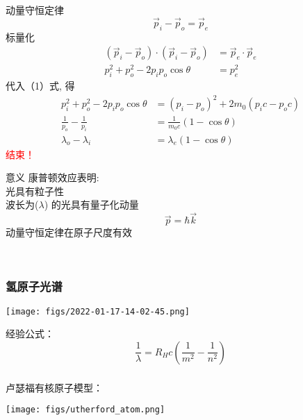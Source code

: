 \begin{frame}  
    动量守恒定律
    \[\vec{p}_i -\vec{p}_o = \vec{p}_e\]
    标量化
    \begin{equation*}
        \begin{split}
            (\vec{p}_i -\vec{p}_o)\cdot (\vec{p}_i -\vec{p}_o)  &= \vec{p}_e\cdot \vec{p}_e   \\
            p_i ^2 + p_o ^2 -2p_i p_o \cos \theta &= p_e ^2  
        \end{split}
    \end{equation*}
    代入（1）式, 得
    \begin{equation*}
        \begin{split}
            p_i ^2 + p_o ^2 -2p_i p_o \cos \theta &= (p_i-p_o)^2 +2 m_0 (p_i c-p_o c) \\
            \frac{1}{p_o} -\frac{1}{p_i} &= \frac{1}{m_0 c} (1-\cos \theta) \\
            \lambda_o -\lambda_i &= \lambda _e (1-\cos \theta) 
        \end{split}
    \end{equation*}
    \textcolor{red}{结束！}
\end{frame}

\begin{frame}   
    \begin{atcbox}{意义}
        康普顿效应表明:\\
        {\Bullet}光具有粒子性 \\
        {\Bullet} 波长为($\lambda$) 的光具有量子化动量 \[\vec{p}=\hbar \vec{k}\]
        {\Bullet} 动量守恒定律在原子尺度有效
    \end{atcbox}   
    \color{deepred}{Nobel Prize in physics（1927）}\\
\end{frame}

\begin{frame}  
     \frametitle{氢原子光谱}
     \begin{center}
        \texttt{[image: figs/2022-01-17-14-02-45.png]}
    \end{center}  
    经验公式：
       $$\dfrac{1}{\lambda}=R_H c (\dfrac{1}{m^2} -\dfrac{1}{n^2})$$ 
\end{frame}

\begin{frame} 
    \frametitle{}  
    卢瑟福有核原子模型：
    \begin{center}
        \texttt{[image: figs/utherford\_atom.png]}
    \end{center}  
\end{frame}

